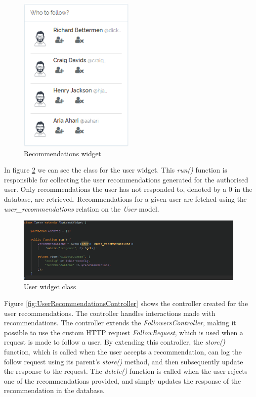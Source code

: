 \begin{figure}[H]
\centering
\includegraphics[height=3in]{Images/Implementation/RecommendationsWidget}
\caption{Recommendations widget}
\label{fig:RecommendationsWidget}
\end{figure}

In figure \ref{fig:UsersWidget} we can see the class for the user widget. This \textit{run()} function is responsible for collecting the user recommendations generated for the authorised user. Only recommendations the user has not responded to, denoted by a 0 in the database, are retrieved. Recommendations for a given user are fetched using the \textit{user\_recommendations} relation on the \emph{User} model.

\begin{figure}[H]
\centering
\includegraphics[width=1\textwidth]{Images/Implementation/UsersWidget}
\caption{User widget class}
\label{fig:UsersWidget}
\end{figure}

Figure \ref{fig:UserRecommendationsController} shows the controller created for the user recommendations. The controller handles interactions made with recommendations. The controller extends the \textit{FollowersController}, making it possible to use the custom HTTP request \textit{FollowRequest}, which is used when a request is made to follow a user. By extending this controller, the \textit{store()} function, which is called when the user accepts a recommendation, can log the follow request using its parent's \textit{store()} method, and then subsequently update the response to the request. The \textit{delete()} function is called when the user rejects one of the recommendations provided, and simply updates the response of the recommendation in the database.

